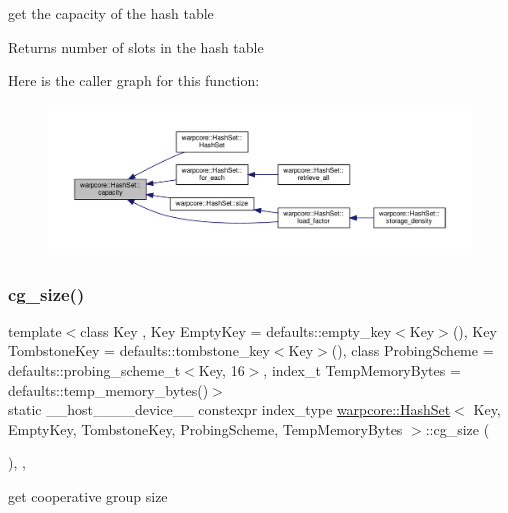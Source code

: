 get the capacity of the hash table 

\begin{DoxyReturn}{Returns}
number of slots in the hash table 
\end{DoxyReturn}
Here is the caller graph for this function\+:
\nopagebreak
\begin{figure}[H]
\begin{center}
\leavevmode
\includegraphics[width=350pt]{classwarpcore_1_1HashSet_a6edef2d260c214f294b61bb394a11545_icgraph}
\end{center}
\end{figure}
\mbox{\label{classwarpcore_1_1HashSet_a0906259ae0be4a4f6f9ba74b4874e542}} 
\subsubsection{\texorpdfstring{cg\+\_\+size()}{cg\_size()}}
{\footnotesize\ttfamily template$<$class Key , Key Empty\+Key = defaults\+::empty\+\_\+key$<$\+Key$>$(), Key Tombstone\+Key = defaults\+::tombstone\+\_\+key$<$\+Key$>$(), class Probing\+Scheme  = defaults\+::probing\+\_\+scheme\+\_\+t$<$\+Key, 16$>$, index\+\_\+t Temp\+Memory\+Bytes = defaults\+::temp\+\_\+memory\+\_\+bytes()$>$ \\
static \+\_\+\+\_\+host\+\_\+\+\_\+\+\_\+\+\_\+device\+\_\+\+\_\+ constexpr index\+\_\+type \hyperlink{classwarpcore_1_1HashSet}{warpcore\+::\+Hash\+Set}$<$ Key, Empty\+Key, Tombstone\+Key, Probing\+Scheme, Temp\+Memory\+Bytes $>$\+::cg\+\_\+size (\begin{DoxyParamCaption}{ }\end{DoxyParamCaption})\hspace{0.3cm}{\ttfamily [inline]}, {\ttfamily [static]}, {\ttfamily [noexcept]}}



get cooperative group size 

